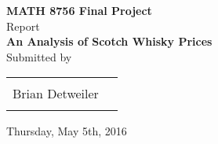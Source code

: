 \begin{titlepage}

\begin{center}

\textup{\small {\bf MATH 8756 Final Project} \\ Report}\\[0.2in]

\Large \textbf {An Analysis of Scotch Whisky Prices}\\[0.5in]



\normalsize Submitted by \\
\begin{table}[h]
\centering
\begin{tabular}{lr}\hline \\
Brian Detweiler \\
\\ \hline
\end{tabular}
\end{table}

\vspace{.1in}
Thursday, May 5th, 2016

\vfill



\end{center}

\end{titlepage}
